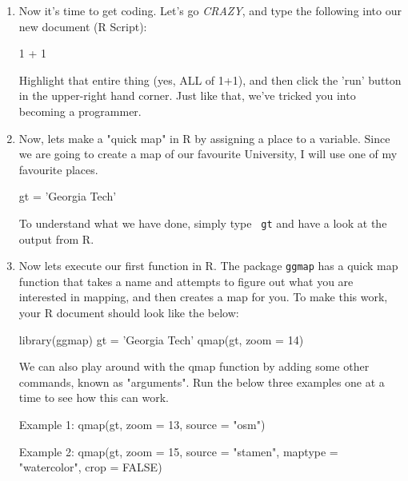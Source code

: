 \documentclass{article}
\newenvironment{Schunk}{}{}
\newcommand{\code}[1]{\texttt{#1}}
\newcommand{\pkg}[1]{\mbox{\texttt{#1}}}
\newcommand{\proglang}[1]{\textsf{#1}}
\begin{document}
\begin{enumerate}[leftmargin=15mm]
\item Now it's time to get coding.  Let's go \textit{CRAZY}, and type the following into our new document (R Script): 

\begin{Schunk}
\begin{Sinput}
1 + 1
\end{Sinput}
\end{Schunk}

Highlight that entire thing (yes, ALL of 1+1), and then click the 'run' button in the upper-right hand corner.  Just like that, we've tricked you into becoming a programmer.

\item Now, lets make a "quick map" in R by assigning a place to a variable. Since we are going to create a map of our favourite University, I will use one of my favourite places.

\begin{Schunk}
\begin{Sinput}
gt = 'Georgia Tech'
\end{Sinput}
\end{Schunk}

To understand what we have done, simply type \code{ gt} and have a look at the output from \proglang{R}.

\item Now lets execute our first function in \proglang{R}.  The package \pkg{ggmap} has a quick map function that takes a name and attempts to figure out what you are interested in mapping, and then creates a map for you.  To make this work, your R document should look like the below:

\begin{Schunk}
\begin{Sinput}
library(ggmap)
gt = 'Georgia Tech'
qmap(gt, zoom = 14)
\end{Sinput}
\end{Schunk}

We can also play around with the qmap function by adding some other commands, known as "arguments".  Run the below three examples one at a time to see how this can work.

\begin{Schunk}
\begin{Sinput}

Example 1: qmap(gt, zoom = 13, source = "osm")

Example 2: qmap(gt, zoom = 15, source = "stamen", 
maptype = "watercolor", crop = FALSE)


\end{Sinput}
\end{Schunk}
\end{enumerate}
\end{document}
